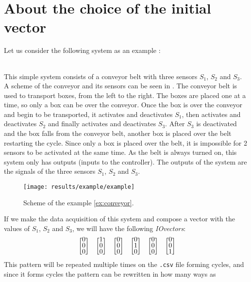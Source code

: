 \section{About the choice of the initial vector}
Let us consider the following system as an example : 
\begin{example}~\\
  \label{ex:conveyor}
 This simple system consists of a conveyor belt with three sensors $S_1$, $S_2$ and
 $S_3$. A scheme of the conveyor and its sensors can be seen in
 . The conveyor belt is used to transport boxes, from
 the left to the right. The boxes are placed one at a time, so only a box can be
 over the conveyor. Once the box is over
 the conveyor and begin to be transported, it activates and deactivates $S_1$,
 then activates and deactivates $S_2$ and
 finally activates and deactivates $S_3$. After $S_3$ is deactivated and the box
 falls from the conveyor belt, another
 box is placed over the
 belt restarting the cycle. Since only a box is placed over the belt,
 it is impossible for 2 sensors to be activated at the same time.  As the belt is always turned on, this system
 only has outputs (inputs to the controller). The outputs of the system are the signals of the three sensors $S_1$, $S_2$ and
 $S_3$.
\end{example}
\begin{figure}[H]
  \centering
  \texttt{[image: results/example/example]}
  \caption{Scheme of the example \ref{ex:conveyor}.}
    \label{fig:schemeExConveyor}
\end{figure}
If we make the data acquisition of this system and compose a vector with the
values of $S_1$, $S_2$ and $S_3$, we will have the following \emph{IOvectors}:
\begin{align}
  \label{motif}
\colvec{0\\0\\0}\colvec{1\\0\\0}\colvec{0\\0\\0}\colvec{0\\1\\0}\colvec{0\\0\\0}\colvec{0\\0\\1}
\end{align}
This pattern will be repeated multiple times on the \verb|.csv| file forming
cycles, and since it forms cycles the pattern can be rewritten in how many ways as
